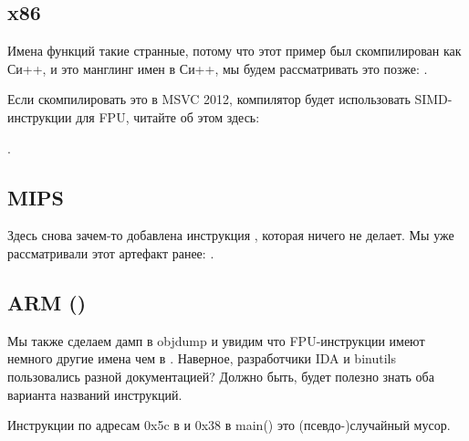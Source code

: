 \subsection{x86}



Имена функций такие странные, потому что этот пример был скомпилирован как Си++, и это манглинг имен в Си++, мы будем рассматривать это позже: .

Если скомпилировать это в MSVC 2012, компилятор будет использовать SIMD-инструкции для FPU, читайте об этом здесь:

.

\subsection{MIPS}



Здесь снова зачем-то добавлена инструкция , которая ничего не делает.
Мы уже рассматривали этот артефакт ранее: .

\subsection{ARM (\ARMMode)}



Мы также сделаем дамп в objdump и увидим что FPU-инструкции имеют немного другие имена чем в \IDA.
Наверное, разработчики IDA и binutils пользовались разной документацией?
Должно быть, будет полезно знать оба варианта названий инструкций.



Инструкции по адресам 0x5c в  и 0x38 в main() это (псевдо-)случайный мусор.

